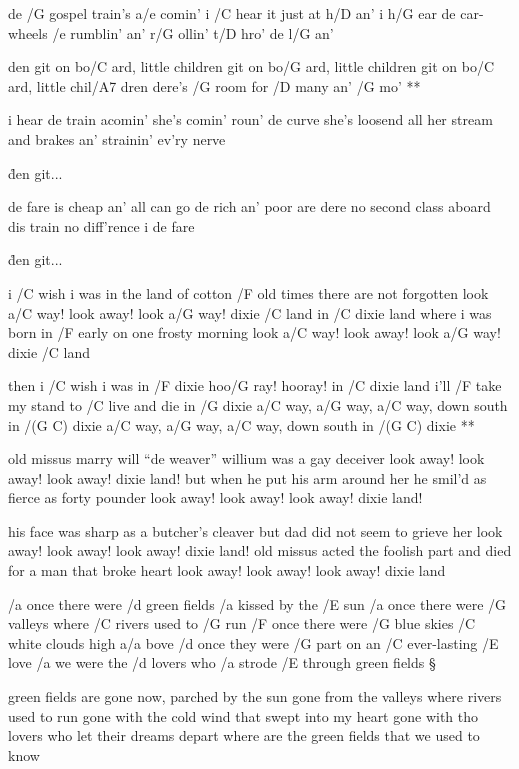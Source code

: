 
de /G gospel train's a/e comin'
i /C hear it just at h/D an'
i h/G ear de car-wheels /e rumblin'
an' r/G ollin' t/D hro' de l/G an'

\R  den git on bo/C ard, little children
    git on bo/G ard, little children
    git on bo/C ard, little chil/A7 dren
    dere's /G room for /D many an' /G mo' **


i hear de train acomin'
she's comin' roun' de curve
she's loosend all her stream and brakes
an' strainin' ev'ry nerve

\r den git...

de fare is cheap an' all can go
de rich an' poor are dere
no second class aboard dis train
no diff'rence i de fare

\r den git...




i /C wish i was in the land of cotton
/F old times there are not forgotten
look a/C way! look away! look a/G way! dixie /C land
in /C dixie land where i was born in
/F early on one frosty morning
look a/C way! look away! look a/G way! dixie /C land

\R  then i /C wish i was in /F dixie hoo/G ray! hooray!
    in /C dixie land i'll /F take my stand
    to /C live and die in /G dixie
    a/C way, a/G way, a/C way, down south in /{(G C)} dixie
    a/C way, a/G way, a/C way, down south in /{(G C)} dixie **


old missus marry will ``de weaver''
willium was a gay deceiver
look away! look away! look away! dixie land!
but when he put his arm around her
he smil'd as fierce as forty pounder
look away! look away! look away! dixie land! \s

his face was sharp as a butcher's cleaver
but dad did not seem to grieve her
look away! look away! look away! dixie land!
old missus acted the foolish part
and died for a man that broke heart
look away! look away! look away! dixie land




/a once there were /d green fields /a kissed by the /E sun
/a once there were /G valleys where /C rivers used to /G run
/F once there were /G blue skies /C white clouds high a/a bove
/d once they were /G part on an /C ever-lasting /E love
/a we were the /d lovers who /a strode /E through green fields \S

green fields are gone now, parched by the sun
gone from the valleys where rivers used to run
gone with the cold wind that swept into my heart
gone with tho lovers who let their dreams depart
where are the green fields that we used to know

